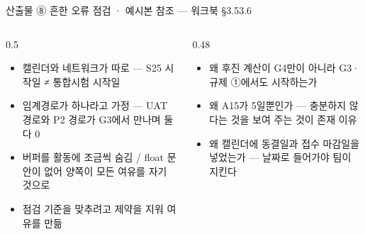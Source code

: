 \begin{frame}{산출물 ⑧ 흔한 오류 점검 · 예시본 참조 — 워크북 §3.5\til{}3.6}
\begin{columns}[T]
\begin{column}{0.5\textwidth}
\begin{itemize}
\item 캘린더와 네트워크가 따로 — S25 시작일 ≠ 통합시험 시작일
\item 임계경로가 하나라고 가정 — UAT 경로와 P2 경로가 G3에서 만나며 둘 다 0
\item 버퍼를 활동에 조금씩 숨김 / float 문안이 없어 양쪽이 모든 여유를 자기 것으로
\item 점검 기준을 맞추려고 제약을 지워 여유를 만듦
\end{itemize}
\end{column}
\begin{column}{0.48\textwidth}
\begin{itemize}
\item 왜 후진 계산이 G4만이 아니라 G3·규제 ①에서도 시작하는가
\item 왜 A15가 5일뿐인가 — 충분하지 않다는 것을 보여 주는 것이 존재 이유
\item 왜 캘린더에 동결일과 접수 마감일을 넣었는가 — 날짜로 들어가야 팀이 지킨다
\end{itemize}
\end{column}
\end{columns}
\end{frame}

